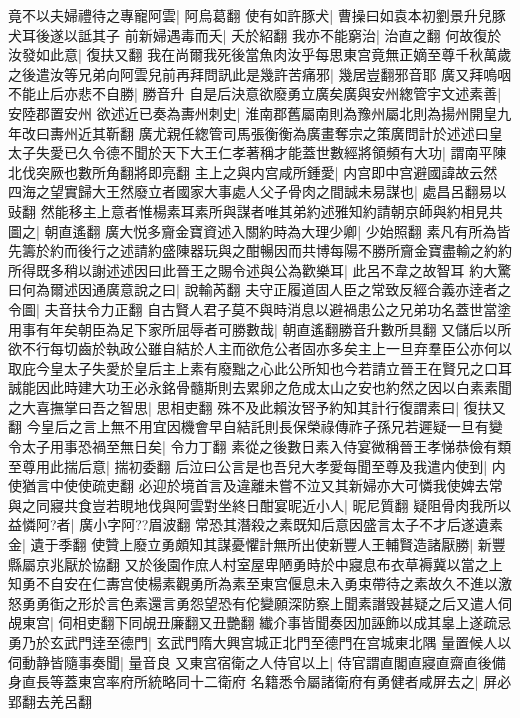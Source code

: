 竟不以夫婦禮待之專寵阿雲|{
	阿烏葛翻}
使有如許豚犬|{
	曹操曰如袁本初劉景升兒豚犬耳後遂以詆其子}
前新婦遇毒而夭|{
	夭於紹翻}
我亦不能窮治|{
	治直之翻}
何故復於汝發如此意|{
	復扶又翻}
我在尚爾我死後當魚肉汝乎每思東宫竟無正嫡至尊千秋萬歲之後遣汝等兄弟向阿雲兒前再拜問訊此是幾許苦痛邪|{
	幾居豈翻邪音耶}
廣又拜嗚咽不能止后亦悲不自勝|{
	勝音升}
自是后決意欲廢勇立廣矣廣與安州緫管宇文述素善|{
	安陸郡置安州}
欲述近已奏為夀州刺史|{
	淮南郡舊屬南則為豫州屬北則為揚州開皇九年改曰夀州近其靳翻}
廣尤親任緫管司馬張衡衡為廣畫奪宗之策廣問計於述述曰皇太子失愛已久令德不聞於天下大王仁孝著稱才能蓋世數經將領頻有大功|{
	謂南平陳北伐突厥也數所角翻將即亮翻}
主上之與内宫咸所鍾愛|{
	内宫即中宫避國諱故云然}
四海之望實歸大王然廢立者國家大事處人父子骨肉之間誠未易謀也|{
	處昌呂翻易以䜴翻}
然能移主上意者惟楊素耳素所與謀者唯其弟約述雅知約請朝京師與約相見共圖之|{
	朝直遙翻}
廣大悦多齎金寶資述入關約時為大理少卿|{
	少始照翻}
素凡有所為皆先籌於約而後行之述請約盛陳器玩與之酣暢因而共博每陽不勝所齎金寶盡輸之約約所得既多稍以謝述述因曰此晉王之賜令述與公為歡樂耳|{
	此呂不韋之故智耳}
約大驚曰何為爾述因通廣意說之曰|{
	說輸芮翻}
夫守正履道固人臣之常致反經合義亦逹者之令圖|{
	夫音扶令力正翻}
自古賢人君子莫不與時消息以避禍患公之兄弟功名蓋世當塗用事有年矣朝臣為足下家所屈辱者可勝數哉|{
	朝直遙翻勝音升數所具翻}
又儲后以所欲不行每切齒於執政公雖自結於人主而欲危公者固亦多矣主上一旦弃羣臣公亦何以取庇今皇太子失愛於皇后主上素有廢黜之心此公所知也今若請立晉王在賢兄之口耳誠能因此時建大功王必永銘骨髓斯則去累卵之危成太山之安也約然之因以白素素聞之大喜撫掌曰吾之智思|{
	思相吏翻}
殊不及此賴汝唘予約知其計行復謂素曰|{
	復扶又翻}
今皇后之言上無不用宜因機會早自結託則長保榮祿傳祚子孫兄若遲疑一旦有變令太子用事恐禍至無日矣|{
	令力丁翻}
素從之後數日素入侍宴微稱晉王孝悌恭儉有類至尊用此揣后意|{
	揣初委翻}
后泣曰公言是也吾兒大孝愛每聞至尊及我遣内使到|{
	内使猶言中使使疏吏翻}
必迎於境首言及違離未嘗不泣又其新婦亦大可憐我使婢去常與之同寢共食豈若睍地伐與阿雲對坐終日酣宴昵近小人|{
	昵尼質翻}
疑阻骨肉我所以益憐阿?者|{
	廣小字阿??眉波翻}
常恐其潛殺之素既知后意因盛言太子不才后遂遺素金|{
	遺于季翻}
使贊上廢立勇頗知其謀憂懼計無所出使新豐人王輔賢造諸厭勝|{
	新豐縣屬京兆厭於協翻}
又於後園作庶人村室屋卑陋勇時於中寢息布衣草褥冀以當之上知勇不自安在仁夀宫使楊素觀勇所為素至東宫偃息未入勇束帶待之素故久不進以激怒勇勇衘之形於言色素還言勇怨望恐有佗變願深防察上聞素譖毁甚疑之后又遣人伺覘東宫|{
	伺相吏翻下同覘丑廉翻又丑艷翻}
纎介事皆聞奏因加誣飾以成其辠上遂疏忌勇乃於玄武門逹至德門|{
	玄武門隋大興宫城正北門至德門在宫城東北隅}
量置候人以伺動静皆隨事奏聞|{
	量音良}
又東宫宿衛之人侍官以上|{
	侍官謂直閣直寢直齋直後備身直長等蓋東宫率府所統略同十二衛府}
名籍悉令屬諸衛府有勇健者咸屏去之|{
	屏必郢翻去羌呂翻}
